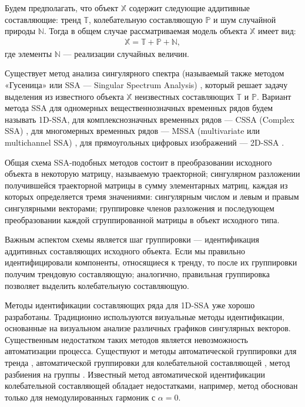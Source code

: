 \documentclass[specialist,
               substylefile = spbu.rtx,
               subf,href,colorlinks=true, 12pt]{disser}
\begin{document}
Будем предполагать, что объект $\mathbb{X}$ содержит следующие аддитивные составляющие: тренд $\mathbb{T}$, колебательную составляющую $\mathbb{P}$ и шум случайной природы $\mathbb{N}$. Тогда в общем случае рассматриваемая модель объекта $\mathbb{X}$ имеет вид:
\begin{gather*}
\mathbb{X} = \mathbb{T}+\mathbb{P}+\mathbb{N},
\end{gather*}
где элементы $\mathbb{N}$ --- реализации случайных величин.

Существует метод анализа сингулярного спектра (называемый также методом «Гусеница» или SSA --- Singular Spectrum Analysis) \cite{Golyandina.etal2001}, который решает задачу выделения из известного объекта $\mathbb{X}$ неизвестных составляющих $\mathbb{T}$ и $\mathbb{P}$.
Вариант метода SSA для одномерных вещественнозначных временных рядов будем называть 1D-SSA, для комплекснозначных временных рядов --- CSSA (Complex SSA) \cite{Golyandina.etal2003,Keppenne.Lall1996,Eftaxias.etal2015}, для многомерных временных рядов --- MSSA (multivariate или multichannel SSA) \cite{Golyandina.etal2003, Rssa}, для прямоугольных цифровых изображений --- 2D-SSA \cite{Golyandina.Usevich2010,Rssa}.

Общая схема SSA-подобных методов состоит в преобразовании исходного объекта в некоторую матрицу, называемую траекторной; сингулярном разложении получившейся траекторной матрицы в сумму элементарных матриц, каждая из которых определяется тремя значениями: сингулярным числом и левым и правым сингулярными векторами; группировке членов разложения и последующем преобразовании каждой сгруппированной матрицы в объект исходного типа.

Важным аспектом схемы является шаг группировки --- идентификация аддитивных составляющих исходного объекта.
Если мы правильно идентифицировали компоненты, относящиеся к тренду, то после их группировки получим трендовую составляющую;
аналогично, правильная группировка позволяет выделить колебательную составляющую.

Методы идентификации составляющих ряда для 1D-SSA уже хорошо разработаны.
Традиционно используются визуальные методы идентификации, основанные на визуальном анализе различных графиков сингулярных векторов. Существенным недостатком таких методов является невозможность автоматизации процесса. Существуют и методы автоматической группировки для тренда \cite{Alexandrov2009,Golyandina.Zhigljavsky2012}, автоматической группировки для колебательной составляющей \cite{Alexandrov.Golyandina2005, Alexandrov2006}, метод разбиения на группы \cite{Golyandina.Zhigljavsky2012}. Известный метод автоматической идентификации колебательной составляющей \cite{Alexandrov.Golyandina2005} обладает недостатками, например, метод обоснован только для немодулированных гармоник с $\alpha = 0$.
\end{document}

